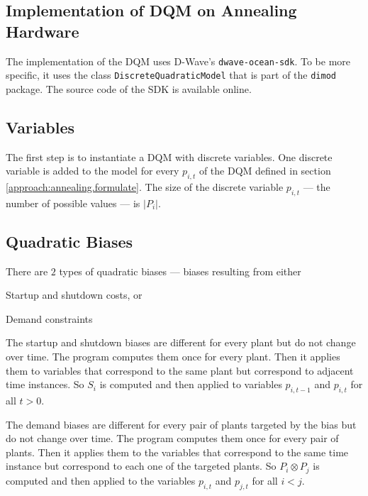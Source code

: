 \subsection{Implementation of DQM on Annealing Hardware}
\label{approach:annealing.implement.dqm}

The implementation of the DQM uses D-Wave's \texttt{dwave-ocean-sdk}.
\cite{OceanSDKDoc}
To be more specific, it uses the class \texttt{DiscreteQuadraticModel} that is part of the \texttt{dimod} package.
\cite{DQMDoc}
The source code of the SDK is available online.
\cite{OceanSDKGit}

\subsection*{Variables}

The first step is to instantiate a DQM with discrete variables.
One discrete variable is added to the model for every $p_{i, t}$ of the DQM defined in section \ref{approach:annealing.formulate}.
The size of the discrete variable $p_{i, t}$ --- the number of possible values --- is $| P_i |$.

\subsection*{Quadratic Biases}

There are $2$ types of quadratic biases
--- biases resulting from either
\begin{enumerate*}[label=(\roman*)]
  \item Startup and shutdown costs, or
  \item Demand constraints
\end{enumerate*}

The startup and shutdown biases are different for every plant but do not change over time.
The program computes them once for every plant.
Then it applies them to variables that correspond to the same plant but correspond to adjacent time instances.
So $S_i$ is computed and then applied to variables $p_{i, t-1}$ and $p_{i, t}$ for all $t > 0$.

The demand biases are different for every pair of plants targeted by the bias but do not change over time.
The program computes them once for every pair of plants.
Then it applies them to the variables that correspond to the same time instance but correspond to each one of the targeted plants.
So $P_i \otimes P_j$ is computed and then applied to the variables $p_{i, t}$ and $p_{j, t}$ for all $i < j$.

